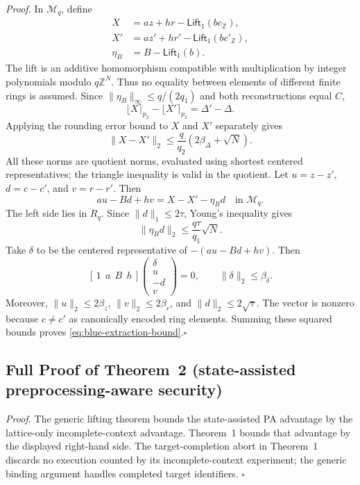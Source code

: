 \documentclass[lettersize,journal]{IEEEtran}
\begin{document}
	\emph{Proof.}
	In $\mathcal M_q$, define
	\[
	\begin{aligned}
		X&=az+hr-\mathsf{Lift}_1(bc_{\mathbb Z}),\\
		X'&=az'+hr'-\mathsf{Lift}_1(bc'_{\mathbb Z}),\\
		\eta_B&=B-\mathsf{Lift}_1(b).
	\end{aligned}
	\]
	The lift is an additive homomorphism compatible with multiplication by
	integer polynomials modulo $q\mathbb Z^N$. Thus no equality between
	elements of different finite rings is assumed. Since
	$\|\eta_B\|_\infty\leq q/(2q_1)$ and both reconstructions equal $C$,
	\[
	\lfloor X\rceil_{p_2}-\lfloor X'\rceil_{p_2}
	=\Delta'-\Delta.
	\]
	Applying the rounding error bound to $X$ and $X'$ separately gives
	\[
	\|X-X'\|_2
	\leq\frac q{q_2}\left(2\beta_\Delta+\sqrt N\right).
	\]
	All these norms are quotient norms, evaluated using shortest centered
	representatives; the triangle inequality is valid in the quotient.
	Let $u=z-z'$, $d=c-c'$, and $v=r-r'$. Then
	\[
	au-Bd+hv=X-X'-\eta_Bd\quad\text{in }\mathcal M_q.
	\]
	The left side lies in $R_q$. Since $\|d\|_1\leq2\tau$, Young's
	inequality gives
	\[
	\|\eta_Bd\|_2\leq\frac{q\tau}{q_1}\sqrt N.
	\]
	Take $\delta$ to be the centered representative of $-(au-Bd+hv)$.
	Then
	\[
	[\,1\ \ a\ \ B\ \ h\,]
	\begin{pmatrix}\delta\\u\\-d\\v\end{pmatrix}=0,
	\qquad \|\delta\|_2\leq\beta_\delta.
	\]
	Moreover, $\|u\|_2\leq2\beta_z$, $\|v\|_2\leq2\beta_r$, and
	$\|d\|_2\leq2\sqrt\tau$. The vector is nonzero because $c\ne c'$
	as canonically encoded ring elements. Summing these squared bounds proves
	\eqref{eq:blue-extraction-bound}.\hfill$\square$
	
	\subsection{Full Proof of Theorem~2 (state-assisted preprocessing-aware security)}
	\label{app:talon-theorem2-proof}
	
	\emph{Proof.}
	The generic lifting theorem bounds the
	state-assisted PA advantage by the lattice-only incomplete-context
	advantage. Theorem~1 bounds that advantage by the displayed
	right-hand side. The target-completion abort in Theorem~1 discards no
	execution counted by its incomplete-context experiment; the generic
	binding argument handles completed target identifiers.
	\hfill$\square$
	
\end{document}
